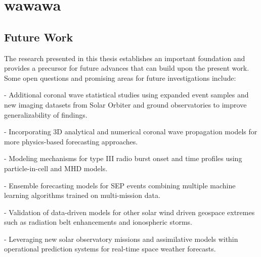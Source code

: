 \chapter{wawawa}
\label{chapter5}

\section{}

\section{}

\section{}

\section{}

\section{Future Work}
The research presented in this thesis establishes an important foundation and provides a precursor for future advances that can build upon the present work. Some open questions and promising areas for future investigations include:

- Additional coronal wave statistical studies using expanded event samples and new imaging datasets from Solar Orbiter and ground observatories to improve generalizability of findings.

- Incorporating 3D analytical and numerical coronal wave propagation models for more physics-based forecasting approaches. 

- Modeling mechanisms for type III radio burst onset and time profiles using particle-in-cell and MHD models. 

- Ensemble forecasting models for SEP events combining multiple machine learning algorithms trained on multi-mission data.

- Validation of data-driven models for other solar wind driven geospace extremes such as radiation belt enhancements and ionospheric storms.

- Leveraging new solar observatory missions and assimilative models within operational prediction systems for real-time space weather forecasts.

